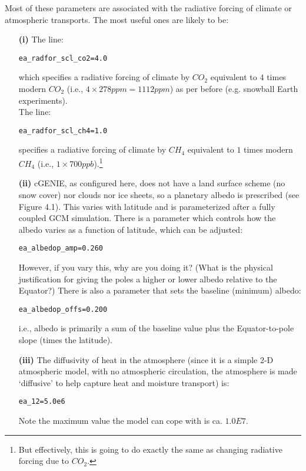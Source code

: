 \documentclass[11pt,fleqn]{book} %
\begin{document}
Most of these parameters are associated with the radiative forcing of climate or atmospheric transports. The most useful ones are likely to be:

\begin{itemize}[noitemsep]

\item[\textbf{(i)}] The line: 
\begin{verbatim}
ea_radfor_scl_co2=4.0
\end{verbatim}
which specifies a radiative forcing of climate by \(CO_{2}\) equivalent to \(4\) times modern \(CO_{2}\) (i.e., \(4\times278 ppm = 1112 ppm\)) as per before (e.g. snowball Earth experiments).
\\The line: 
\begin{verbatim}
ea_radfor_scl_ch4=1.0
\end{verbatim}
specifies a radiative forcing of climate by \(CH_{4}\) equivalent to \(1\) times modern \(CH_{4}\) (i.e., \(1\times700 ppb\)).\footnote{But effectively, this is going to do exactly the same as changing radiative forcing due to \(CO_{2}\).}

\item[\textbf{(ii)}] cGENIE, as configured here, does not have a land surface scheme (no snow cover) nor clouds nor ice sheets, so a planetary albedo is prescribed (see Figure 4.1). This varies with latitude and is parameterized after a fully coupled GCM simulation. There is a parameter which controls how the albedo varies as a function of latitude, which can be adjusted: 
\begin{verbatim}
ea_albedop_amp=0.260
\end{verbatim}
However, if you vary this, why are you doing it? (What is the physical justification for giving the poles a higher or lower albedo relative to the Equator?)
There is also a parameter that sets the baseline (minimum) albedo: 
\begin{verbatim}
ea_albedop_offs=0.200
\end{verbatim}
i.e., albedo is primarily a sum of the baseline value plus the Equator-to-pole slope (times the latitude).

\item[\textbf{(iii)}] The diffusivity of heat in the atmosphere (since it is a simple 2-D atmospheric model, with no atmospheric circulation, the atmosphere is made ‘diffusive’ to help capture heat and moisture transport) is: 
\begin{verbatim}
ea_12=5.0e6
\end{verbatim}
Note the maximum value the model can cope with is ca. \(1.0E7\).

\end{itemize}
\end{document}
